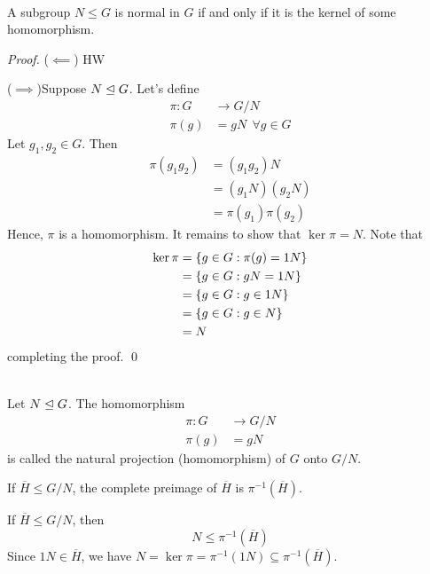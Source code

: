 \begin{theorem} \leavevmode \\
    \label{thmBIG}
    A subgroup $N\leq G$ is normal in $G$ if and only if it is the kernel of some homomorphism.
\end{theorem}

\begin{proof}
    ($\impliedby$) HW 

    ($\implies$)Suppose $N \trianglelefteq G$. Let's define 
    \begin{align*}
        \pi : G &\to G/N \\
        \pi(g) &= gN ~~\forall g \in G
    \end{align*}
    Let $g_1, g_2 \in G$. Then 
    \begin{align*}
        \pi(g_1g_2) &= (g_1g_2)N \\
        &= (g_1N)(g_2N) \\
        &= \pi(g_1)\pi(g_2)
    \end{align*}
    Hence, $\pi$ is a homomorphism. It remains to show that $\ker\pi = N.$ Note that 
    \begin{align*}
        \ker\pi &= \left\{g \in G : \pi(g) = 1N\right\} \\
        &= \left\{g \in G : gN = 1N\right\} \\
        &= \left\{g \in G : g \in 1N\right\} \\
        &= \left\{g \in G : g \in N\right\} \\
        &= N
    \end{align*}
    completing the proof.
    \qed
\end{proof}

\begin{definition} \leavevmode \\
    Let $N\trianglelefteq G$. The homomorphism
    \begin{align*}
        \pi: G &\to G/N \\
        \pi(g) &= gN
    \end{align*}
    is called the natural projection (homomorphism) of $G$ onto $G/N$.
\end{definition}

If $\overline{H} \leq G/N$, the complete preimage of $\overline{H}$ is $\pi^{-1}(\overline{H}).$

\begin{note}
    If $\overline{H} \leq G/N$, then 
    $$N \leq \pi^{-1}(\overline{H})$$
    Since $1N \in \overline{H}$, we have $N = \ker \pi = \pi^{-1}(1N) \subseteq \pi^{-1}(\overline{H})$.
\end{note}

